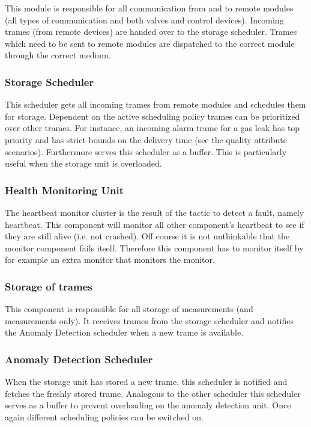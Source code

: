 \npar This module is responsible for all communication from and to remote
modules (all types of communication and both valves and control devices).
Incoming trames (from remote devices) are handed over to the storage scheduler.
Trames which need to be sent to remote modules are dispatched to the correct
module through the correct medium.

\subsubsection{Storage Scheduler}

\npar This scheduler gets all incoming trames from remote modules and schedules
them for storage. Dependent on the active scheduling policy trames can be
prioritized over other trames. For instance, an incoming alarm trame for a gas
leak has top priority and has strict bounds on the delivery time (see the
quality attribute scenarios). Furthermore serves this scheduler as a buffer.
This is particularly useful when the storage unit is overloaded.

\subsubsection{Health Monitoring Unit}

\npar The heartbeat monitor cluster is the result of the tactic to detect a
fault, namely heartbeat. This component will monitor all other component's
heartbeat to see if they are still alive (i.e. not crashed). Off course it is
not unthinkable that the monitor component fails itself. Therefore this
component has to monitor itself by for example an extra monitor that monitors
the monitor.

\subsubsection{Storage of trames}

\npar This component is responsible for all storage of measurements (and
measurements only). It receives trames from the storage scheduler and notifies
the Anomaly Detection scheduler when a new trame is available.

\subsubsection{Anomaly Detection Scheduler}

\npar When the storage unit has stored a new trame, this scheduler is notified
and fetches the freshly stored trame. Analogous to the other scheduler this
scheduler serves as a buffer to prevent overloading on the anomaly detection
unit. Once again different scheduling policies can be switched on.

